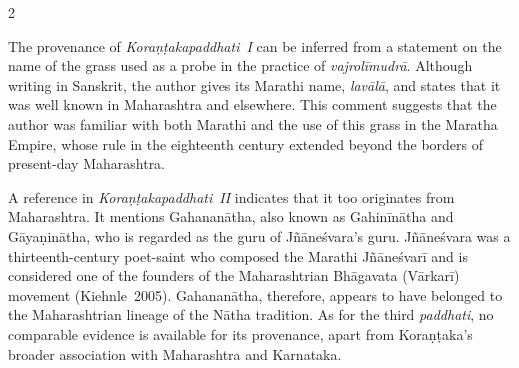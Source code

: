 \begin{nohyp}
\begin{multicols*}{2}
\begin{eng}
The provenance of \emph{Koraṇṭakapaddhati}~\emph{I} can be inferred from a statement on the name of the grass used as a probe in the practice of \emph{vajrolīmudrā}. Although writing in Sanskrit, the author gives its Marathi name, \emph{lavālā}, and states that it was well known in Maharashtra and elsewhere. This comment suggests that the author was familiar with both Marathi and the use of this grass in the Maratha Empire, whose rule in the eighteenth century extended beyond the borders of present-day Maharashtra.

A reference in \emph{Koraṇṭakapaddhati}~\emph{II} indicates that it too originates from Maharashtra. It mentions Gahananātha, also known as Gahinīnātha and Gāyaṇinātha, who is regarded as the guru of Jñāneśvara's guru. Jñāneśvara was a thirteenth-century poet-saint who composed the Marathi Jñāneśvarī and is considered one of the founders of the Maharashtrian Bhāgavata (Vārkarī) movement (Kiehnle~2005). Gahananātha, therefore, appears to have belonged to the Maharashtrian lineage of the Nātha tradition. As for the third \emph{paddhati}, no comparable evidence is available for its provenance, apart from Koraṇṭaka's broader association with Maharashtra and Karnataka.


\end{eng}
\end{multicols*}
\end{nohyp}
